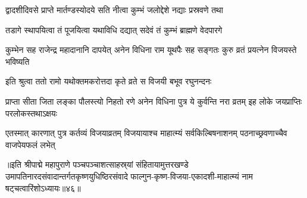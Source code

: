 \twolineshloka
{द्वादशीदिवसे प्राप्ते मार्तण्डस्योदये सति}
{नीत्वा कुम्भं जलोद्देशे नद्याः प्रस्रवणे तथा}%

\twolineshloka
{तडागे स्थापयित्वा तं पूजयित्वा यथाविधि}
{दद्यात् सदेवं तं कुम्भं ब्राह्मणे वेदपारगे}%

\threelineshloka
{कुम्भेन सह राजेन्द्र महादानानि दापयेत्}
{अनेन विधिना राम यूथपैः सह सङ्गतः}
{कुरु व्रतं प्रयत्नेन विजयस्ते भविष्यति}%


\twolineshloka
{इति श्रुत्वा ततो रामो यथोक्तमकरोत्तदा}
{कृते व्रते स विजयी बभूव रघुनन्दनः}%

\threelineshloka
{प्राप्ता सीता जिता लङ्का पौलस्त्यो निहतो रणे}
{अनेन विधिना पुत्र ये कुर्वन्ति नरा व्रतम्}
{इह लोके जयप्राप्तिः परलोकस्तथाऽक्षयः} %


\threelineshloka
{एतस्मात् कारणात् पुत्र कर्तव्यं विजयाव्रतम्}
{विजयायाश्च माहात्म्यं सर्वकिल्बिषनाशनम्}
{पठनाच्छ्रवणाच्चैव वाजपेयफलं लभेत्}%

॥इति श्रीपाद्मे महापुराणे पञ्चपञ्चाशत्साहस्र्यां संहितायामुत्तरखण्डे उमापतिनारदसंवादान्तर्गतकृष्णयुधिष्ठिरसंवादे फाल्गुन-कृष्ण-विजया-एकादशी-माहात्म्यं नाम षट्चत्वारिंशोऽध्यायः॥४६॥

\genMangalaShloka

\hyperref[sec:ekadashi_mahatmyam_padma_puranam]{\closesub}
\clearpage

